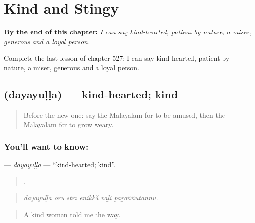 
\chapter{Kind and Stingy}
\label{ch:ml-kind-and-stingy}

\begin{chapteropening}
\textbf{By the end of this chapter:} \emph{I can say kind-hearted, patient by nature, a miser, generous and a loyal person.}

Complete the last lesson of chapter 527: I can say kind-hearted, patient by nature, a miser, generous and a loyal person.
\end{chapteropening}

\section[\texorpdfstring{\ml{ദയയുള്ള} (dayayuḷḷa)}{ദയയുള്ള (dayayuḷḷa)}]{ (dayayuḷḷa) — kind-hearted; kind}

\label{lesson:ML-C527-dayayulla}



\begin{quote}
Before the new one: say the Malayalam for to be amused, then the Malayalam for to grow weary.
\end{quote}

\subsection*{You'll want to know: }
\textbf{} — \emph{dayayuḷḷa} — \textquotedblleft{}kind-hearted; kind\textquotedblright{}.

\begin{quote}
     .
\end{quote}

\begin{quote}
\emph{dayayuḷḷa oru strī enikkŭ vaḻi paṟaññutannu.}
\end{quote}

\begin{quote}
A kind woman told me the way.
\end{quote}

